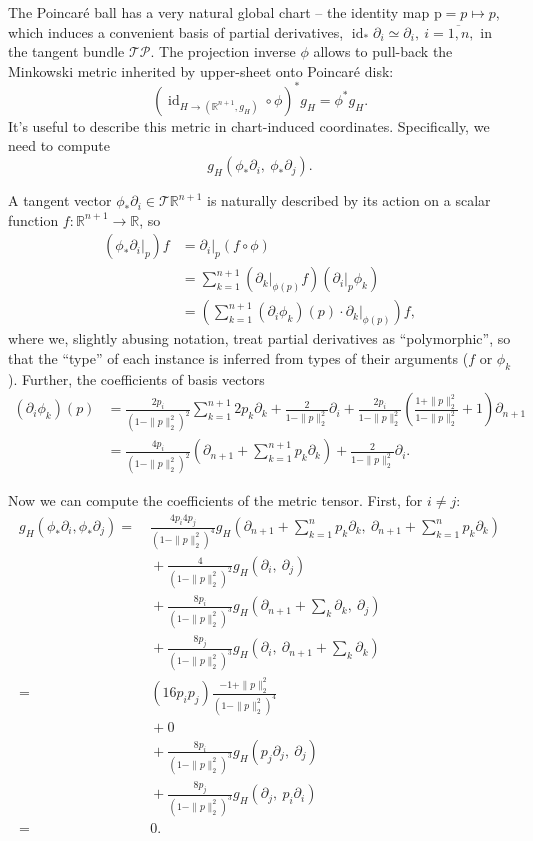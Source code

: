 The Poincar\'e ball has a very natural global chart -- the identity map \(
\mathrm{p}=p\mapsto p \), which induces a convenient basis of partial
derivatives,
\( \operatorname{id}_*\partial_i\simeq\partial_i,~i=\overline{1,n}, \) in the
tangent bundle \( \mathcal{T}\mathcal{P} \). The projection inverse \( \phi \)
allows to pull-back the Minkowski metric inherited by upper-sheet onto
Poincar\'e disk: \[ (\operatorname{id}_{H\to(\mathbb{R}^{n+1},g_H)}\circ
\phi)^* g_H = \phi^*g_H. \]
It's useful to describe this metric in chart-induced
coordinates. Specifically, we need to compute
\[ g_H(\phi_* \partial_i,~\phi_* \partial_j). \]

A tangent vector \( \phi_*\partial_i \in \mathcal{T}\mathbb{R}^{n+1} \) is
naturally described by its action on a scalar function \(
f:\mathbb{R}^{n+1}\to\mathbb{R} \), so
\begin{align*}
(\phi_* \left.\partial_i\right|_p)f &= \left.\partial_i\right|_p(f\circ \phi)\\
&= \sum_{k=1}^{n+1} (\left.\partial_k\right|_{\phi(p)} f) (\left.\partial_i\right|_p \phi_k)\\
&= \left(\sum_{k=1}^{n+1} (\partial_i \phi_k)(p) \cdot
\left.\partial_k\right|_{\phi(p)}\right) f,
\end{align*}
where we, slightly abusing notation, treat partial derivatives as
``polymorphic'', so that the ``type'' of each instance is inferred from types
of their arguments (\( f \) or \( \phi_k \)).
Further, the coefficients of basis vectors
\begin{align*}
(\partial_i\phi_k)(p)
&= \frac{2p_i}{(1-\|p\|_2^2)^2} \sum_{k=1}^{n+1} 2p_k \partial_k
+ \frac{2}{1 - \|p\|_2^2} \partial_i
+ \frac{2p_i}{1 - \|p\|_2^2} \left( \frac{1+\|p\|_2^2}{1-\|p\|_2^2} + 1\right) \partial_{n+1}\\
&= \frac{4p_i}{(1-\|p\|_2^2)^2} (\partial_{n+1} + \sum_{k=1}^{n+1} p_k \partial_k)
+ \frac{2}{1-\|p\|_2^2}\partial_i.
\end{align*}

Now we can compute the coefficients of the metric tensor.
First, for \( i\neq j \):
\begin{align*}
g_H(\phi_*\partial_i, \phi_*\partial_j)
= &~\frac{4p_i 4p_j}{(1 - \|p\|_2^2)^4}
     g_H(\partial_{n+1} + \sum_{k=1}^n p_k \partial_k,~
         \partial_{n+1} + \sum_{k=1}^n p_k \partial_k) \\
  &~+ \frac{4}{(1-\|p\|_2^2)^2} g_H(\partial_i,~\partial_j) \\
  &~+ \frac{8p_i}{(1 - \|p\|_2^2)^3} g_H(\partial_{n+1} + \sum_{k}\partial_k,~\partial_j) \\
  &~+ \frac{8p_j}{(1 - \|p\|_2^2)^3} g_H(\partial_i,~\partial_{n+1} + \sum_{k}\partial_k) \\
= &~(16p_ip_j)\frac{-1 + \|p\|_2^2}{(1 - \|p\|_2^2)^4} \\
  &~+ 0 \\
  &~+ \frac{8p_i}{(1 - \|p\|_2^2)^3} g_H(p_j \partial_j,~\partial_j) \\
  &~+ \frac{8p_j}{(1 - \|p\|_2^2)^3} g_H(\partial_j,~p_i \partial_i) \\
= &~0.
\end{align*}

